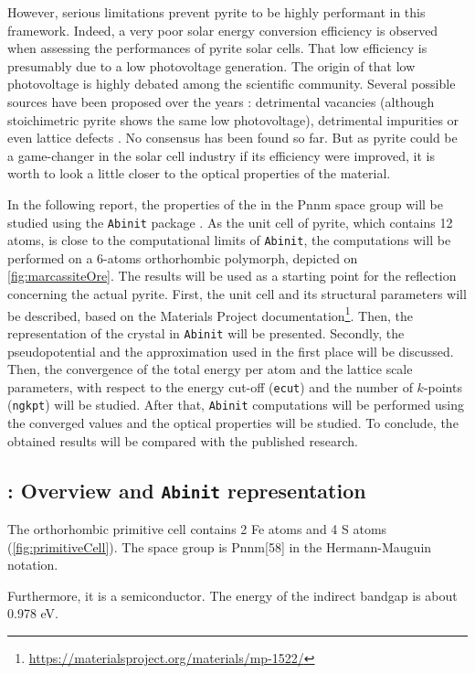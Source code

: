 \documentclass[11pt,a4paper]{article}
\begin{document}
However, serious limitations prevent pyrite to be highly performant in this framework. Indeed, a very poor solar energy conversion efficiency is observed when assessing the performances of pyrite solar cells. That low efficiency is presumably due to a low photovoltage generation. The origin of that low photovoltage is highly debated among the scientific community. Several possible sources have been proposed over the years : detrimental  vacancies (although stoichimetric pyrite shows the same low photovoltage), detrimental impurities or even lattice defects \cite{limitations}. No consensus has been found so far. But as pyrite could be a game-changer in the solar cell industry if its efficiency were improved, it is worth to look a little closer to the optical properties of the material.

In the following report, the properties of the  in the Pnnm space group will be studied using the \texttt{Abinit} package \cite{Abinit}. As the unit cell of pyrite, which contains 12 atoms, is close to the computational limits of \texttt{Abinit}, the computations will be performed on a 6-atoms orthorhombic polymorph, depicted on \autoref{fig:marcassiteOre}. The results will be used as a starting point for the reflection concerning the actual pyrite. First, the unit cell and its structural parameters will be described, based on the Materials Project documentation\footnote{\url{https://materialsproject.org/materials/mp-1522/}}. Then, the representation of the crystal in \texttt{Abinit} will be presented. Secondly, the pseudopotential and the approximation used in the first place will be discussed. Then, the convergence of the total energy per atom and the lattice scale parameters, with respect to the energy cut-off (\texttt{ecut}) and the number of $k$-points (\texttt{ngkpt}) will be studied. After that, \texttt{Abinit} computations will be performed using the converged values and the optical properties will be studied. To conclude, the obtained results will be compared with the published research.
\subsection{ : Overview and \texttt{Abinit} representation}
The orthorhombic  primitive cell contains 2 Fe atoms and 4 S atoms (\autoref{fig:primitiveCell}). The space group is Pnnm[58] in the Hermann-Mauguin notation. 

Furthermore, it is a semiconductor. The energy of the indirect bandgap is about 0.978 eV\cite{MaterialsProject}.
\end{document}
